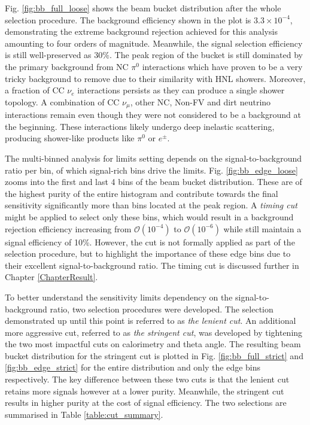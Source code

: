 Fig. \ref{fig:bb_full_loose} shows the beam bucket distribution after the whole selection procedure.
The background efficiency shown in the plot is $3.3 \times 10^{-4}$, demonstrating the extreme background rejection achieved for this analysis amounting to four orders of magnitude.
Meanwhile, the signal selection efficiency is still well-preserved as $30\%$. 
The peak region of the bucket is still dominated by the primary background from NC $\pi^0$ interactions which have proven to be a very tricky background to remove due to their similarity with HNL showers.
Moreover, a fraction of CC $\nu_e$ interactions persists as they can produce a single shower topology. 
A combination of CC $\nu_\mu$, other NC, Non-FV and dirt neutrino interactions remain even though they were not considered to be a background at the beginning.
These interactions likely undergo deep inelastic scattering, producing shower-like products like $\pi^0$ or $e^{\pm}$.

The multi-binned analysis for limits setting depends on the signal-to-background ratio per bin, of which signal-rich bins drive the limits.
Fig. \ref{fig:bb_edge_loose} zooms into the first and last 4 bins of the beam bucket distribution.
These are of the highest purity of the entire histogram and contribute towards the final sensitivity significantly more than bins located at the peak region. 
A \textit{timing cut} might be applied to select only these bins, which would result in a background rejection efficiency increasing from $\mathcal{O}(10^{-4})$ to $\mathcal{O}(10^{-6})$ while still maintain a signal efficiency of 10\%.
However, the cut is not formally applied as part of the selection procedure, but to highlight the importance of these edge bins due to their excellent signal-to-background ratio.
The timing cut is discussed further in Chapter \ref{ChapterResult}.

To better understand the sensitivity limits dependency on the signal-to-background ratio, two selection procedures were developed.
The selection demonstrated up until this point is referred to as \textit{the lenient cut}.
An additional more aggressive cut, referred to as \textit{the stringent cut}, was developed by tightening the two most impactful cuts on calorimetry and theta angle. 
The resulting beam bucket distribution for the stringent cut is plotted in Fig. \ref{fig:bb_full_strict} 
and \ref{fig:bb_edge_strict} for the entire distribution and only the edge bins respectively. 
The key difference between these two cuts is that the lenient cut retains more signals however at a lower purity.
Meanwhile, the stringent cut results in higher purity at the cost of signal efficiency.
The two selections are summarised in Table \ref{table:cut_summary}.


